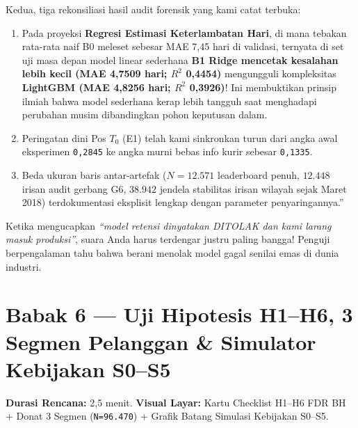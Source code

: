 \documentclass[11pt,a4paper,oneside]{book}
\newcommand{\code}[1]{{\small\nolinkurl{#1}}}
\begin{document}
\begin{scriptbox}
Kedua, tiga rekonsiliasi hasil audit forensik yang kami catat terbuka:
\begin{enumerate}
  \item Pada proyeksi \textbf{Regresi Estimasi Keterlambatan Hari}, di mana tebakan rata-rata naif B0 meleset sebesar MAE 7,45 hari di validasi, ternyata di set uji masa depan model linear sederhana \textbf{B1 Ridge mencetak kesalahan lebih kecil (MAE 4,7509 hari; $R^2$ 0,4454)} mengungguli kompleksitas \textbf{LightGBM (MAE 4,8256 hari; $R^2$ 0,3926)}! Ini membuktikan prinsip ilmiah bahwa model sederhana kerap lebih tangguh saat menghadapi perubahan musim dibandingkan pohon keputusan dalam.
  \item Peringatan dini Pos $T_0$ (E1) telah kami sinkronkan turun dari angka awal eksperimen \code{0,2845} ke angka murni bebas info kurir sebesar \code{0,1335}.
  \item Beda ukuran baris antar-artefak ($N = 12.571$ leaderboard penuh, $12.448$ irisan audit gerbang G6, $38.942$ jendela stabilitas irisan wilayah sejak Maret 2018) terdokumentasi eksplisit lengkap dengan parameter penyaringannya.''
\end{enumerate}
\end{scriptbox}

\begin{tipbox}
Ketika mengucapkan \emph{``model retensi dinyatakan DITOLAK dan kami larang masuk produksi''}, suara Anda harus terdengar justru paling bangga! Penguji berpengalaman tahu bahwa berani menolak model gagal senilai emas di dunia industri.
\end{tipbox}

\section{Babak 6 --- Uji Hipotesis H1--H6, 3 Segmen Pelanggan \& Simulator Kebijakan S0--S5}

\begin{stagebox}
\textbf{Durasi Rencana:} 2,5 menit. \quad \textbf{Visual Layar:} Kartu Checklist H1--H6 FDR BH + Donat 3 Segmen (\code{N=96.470}) + Grafik Batang Simulasi Kebijakan S0--S5.
\end{stagebox}
\end{document}
